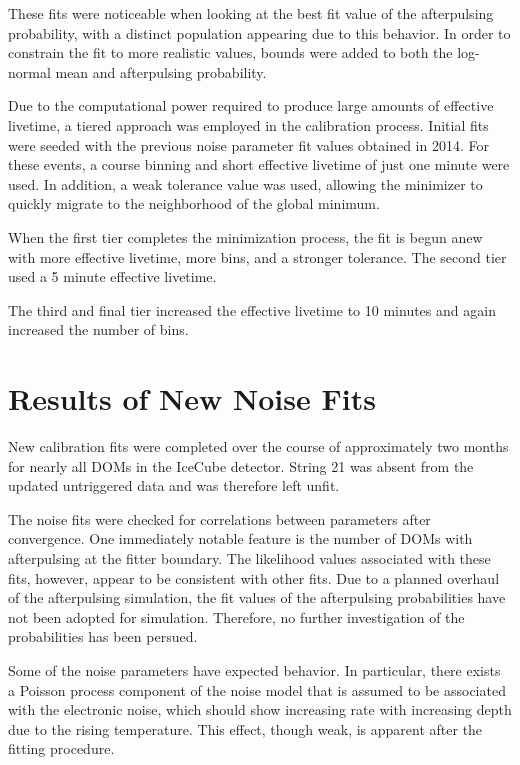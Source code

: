 These fits were noticeable when looking at the best fit value of the afterpulsing probability, with a distinct population appearing due to this behavior.
In order to constrain the fit to more realistic values, bounds were added to both the log-normal mean and afterpulsing probability. 

Due to the computational power required to produce large amounts of effective livetime, a tiered approach was employed in the calibration process.
Initial fits were seeded with the previous noise parameter fit values obtained in 2014.
For these events, a course binning and short effective livetime of just one minute were used.
In addition, a weak tolerance value was used, allowing the minimizer to quickly migrate to the neighborhood of the global minimum.

When the first tier completes the minimization process, the fit is begun anew with more effective livetime, more bins, and a stronger tolerance.
The second tier used a 5 minute effective livetime.

The third and final tier increased the effective livetime to 10 minutes and again increased the number of bins.

\label{sec:vuvuzela_newfits}
\section{Results of New Noise Fits}
New calibration fits were completed over the course of approximately two months for nearly all DOMs in the IceCube detector.
String 21 was absent from the updated untriggered data and was therefore left unfit.

The noise fits were checked for correlations between parameters after convergence.
One immediately notable feature is the number of DOMs with afterpulsing at the fitter boundary.
The likelihood values associated with these fits, however, appear to be consistent with other fits.
Due to a planned overhaul of the afterpulsing simulation, the fit values of the afterpulsing probabilities have not been adopted for simulation.
Therefore, no further investigation of the probabilities has been persued.

Some of the noise parameters have expected behavior.
In particular, there exists a Poisson process component of the noise model that is assumed to be associated with the electronic noise, which should show increasing rate with increasing depth due to the rising temperature.
This effect, though weak, is apparent after the fitting procedure.

